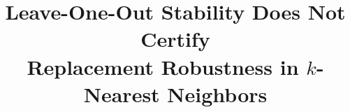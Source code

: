 \documentclass{article}
\title{Leave-One-Out Stability Does Not Certify\\ Replacement Robustness in $k$-Nearest Neighbors}
\author{}
\date{}
\theoremstyle{definition}
\theoremstyle{remark}
\begin{document}
\maketitle















\appendix





\FloatBarrier


\end{document}
